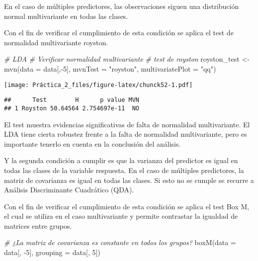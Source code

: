 \documentclass[
]{article}
\newenvironment{Shaded}{\begin{snugshade}}{\end{snugshade}}
\newcommand{\AttributeTok}[1]{\textcolor[rgb]{0.77,0.63,0.00}{#1}}
\newcommand{\CommentTok}[1]{\textcolor[rgb]{0.56,0.35,0.01}{\textit{#1}}}
\newcommand{\DecValTok}[1]{\textcolor[rgb]{0.00,0.00,0.81}{#1}}
\newcommand{\FunctionTok}[1]{\textcolor[rgb]{0.00,0.00,0.00}{#1}}
\newcommand{\NormalTok}[1]{#1}
\newcommand{\OtherTok}[1]{\textcolor[rgb]{0.56,0.35,0.01}{#1}}
\newcommand{\SpecialCharTok}[1]{\textcolor[rgb]{0.00,0.00,0.00}{#1}}
\newcommand{\StringTok}[1]{\textcolor[rgb]{0.31,0.60,0.02}{#1}}
\begin{document}
En el caso de múltiples predictores, las observaciones siguen una
distribución normal multivariante en todas las clases.

Con el fin de verificar el cumplimiento de esta condición se aplica el
test de normalidad multivariante royston.

\begin{Shaded}
\begin{Highlighting}[]
\CommentTok{\# LDA}
\CommentTok{\# Verificar normalidad multivariante}
\CommentTok{\# test de royston}
\NormalTok{royston\_test }\OtherTok{\textless{}{-}} \FunctionTok{mvn}\NormalTok{(}\AttributeTok{data =}\NormalTok{ data[,}\SpecialCharTok{{-}}\DecValTok{5}\NormalTok{], }\AttributeTok{mvnTest =} \StringTok{"royston"}\NormalTok{, }\AttributeTok{multivariatePlot =} \StringTok{"qq"}\NormalTok{)}
\end{Highlighting}
\end{Shaded}

\texttt{[image: Práctica\_2\_files/figure-latex/chunck52-1.pdf]}

\begin{Shaded}
\end{Shaded}

\begin{verbatim}
##      Test        H      p value MVN
## 1 Royston 50.64564 2.754697e-11  NO
\end{verbatim}

El test muestra evidencias significativas de falta de normalidad
multivariante. El LDA tiene cierta robustez frente a la falta de
normalidad multivariante, pero es importante tenerlo en cuenta en la
conclusión del análisis.

Y la segunda condición a cumplir es que la varianza del predictor es
igual en todas las clases de la variable respuesta. En el caso de
múltiples predictores, la matriz de covarianza es igual en todas las
clases. Si esto no se cumple se recurre a Análisis Discriminante
Cuadrático (QDA).

Con el fin de verificar el cumplimiento de esta condición se aplica el
test Box M, el cual se utiliza en el caso multivariante y permite
contrastar la igualdad de matrices entre grupos.

\begin{Shaded}
\begin{Highlighting}[]
\CommentTok{\# ¿La matriz de covarianza es constante en todos los grupos?}
\FunctionTok{boxM}\NormalTok{(}\AttributeTok{data =}\NormalTok{ data[, }\SpecialCharTok{{-}}\DecValTok{5}\NormalTok{], }\AttributeTok{grouping =}\NormalTok{ data[, }\DecValTok{5}\NormalTok{])}
\end{Highlighting}
\end{Shaded}
\end{document}
